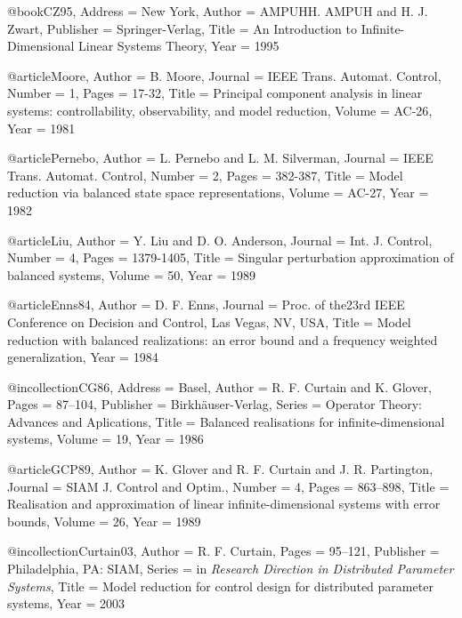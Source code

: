 





@book{CZ95,
	Address = {New York},
	Author = {AMPUHH. AMPUH and H. J. Zwart},
	Publisher = {Springer-Verlag},
	Title = {An Introduction to Infinite-Dimensional Linear Systems Theory},
	Year = {1995}}

@article{Moore,
	Author = {B. Moore},
	Journal = {IEEE Trans. Automat. Control},
	Number = {1},
	Pages = {17-32},
	Title = {Principal component analysis in linear systems: controllability, observability, and model reduction},
	Volume = {AC-26},
	Year = {1981}}

@article{Pernebo,
	Author = {L. Pernebo and L. M. Silverman},
	Journal = {IEEE Trans. Automat. Control},
	Number = {2},
	Pages = {382-387},
	Title = {Model reduction via balanced state space representations},
	Volume = {AC-27},
	Year = {1982}}

@article{Liu,
	Author = {Y. Liu and D. O. Anderson},
	Journal = {Int. J. Control},
	Number = {4},
	Pages = {1379-1405},
	Title = {Singular perturbation approximation of balanced systems},
	Volume = {50},
	Year = {1989}}

@article{Enns84,
	Author = {D. F. Enns},
	Journal = {Proc. of the23rd IEEE Conference on Decision and Control, Las Vegas, NV, USA},
	Title = {Model reduction with balanced realizations: an error bound and a frequency weighted generalization},
	Year = {1984}}

@incollection{CG86,
	Address = {Basel},
	Author = {R. F. Curtain and K. Glover},
	Pages = {87--104},
	Publisher = {Birkh\"{a}user-Verlag},
	Series = {Operator Theory: Advances and Aplications},
	Title = {Balanced realisations for infinite-dimensional systems},
	Volume = {19},
	Year = {1986}}

@article{GCP89,
	Author = {K. Glover and R. F. Curtain and J. R. Partington},
	Journal = {SIAM J. Control and Optim.},
	Number = {4},
	Pages = {863--898},
	Title = {Realisation and approximation of linear infinite-dimensional systems with error bounds},
	Volume = {26},
	Year = {1989}}

@incollection{Curtain03,
	Author = {R. F. Curtain},
	Pages = {95--121},
	Publisher = {Philadelphia, PA: SIAM},
	Series = {in \emph{Research Direction in Distributed Parameter Systems}},
	Title = {Model reduction for control design for distributed parameter systems},
	Year = {2003}}
